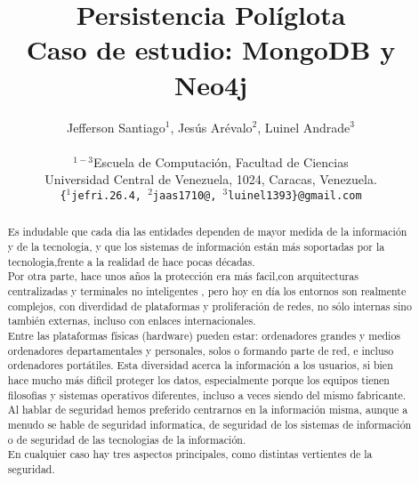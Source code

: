 \documentclass[conference]{IEEEtran}
\begin{document}
\title{Persistencia Pol\'iglota\\Caso de estudio: MongoDB y Neo4j}

\author{
Jefferson Santiago$^{1}$, Jes\'us Ar\'evalo$^{2}$, Luinel Andrade$^{3}$\\ \\
\small{$^{1-3}$Escuela de Computaci\'on, Facultad de Ciencias}\\
\small{Universidad Central de Venezuela, 1024, Caracas, Venezuela.}\\
\small{\texttt{\{$^{1}$jefri.26.4, $^{2}$jaas1710@, $^{3}$luinel1393\}@gmail.com}} %
}
\author{
\and

}


\maketitle


\begin{abstract}
Es indudable que cada dia las entidades dependen de mayor medida de la información y de la tecnologia, y que los sistemas de información están más soportadas por la tecnologia,frente a la realidad de hace pocas décadas.
\\
Por otra parte, hace unos años la protección era más facil,con arquitecturas centralizadas y terminales no inteligentes , pero hoy en día los entornos son realmente complejos, con diverdidad de plataformas y proliferación de redes, no sólo internas sino también externas, incluso con enlaces internacionales.
\\
Entre las plataformas físicas (hardware) pueden estar: ordenadores grandes y medios ordenadores departamentales y personales, solos o formando parte de red, e incluso ordenadores portátiles. Esta diversidad acerca la información a los usuarios, si bien hace mucho más dificil proteger los datos, especialmente porque los equipos tienen filosofias y sistemas operativos diferentes, incluso a veces siendo del mismo fabricante.
\\
Al hablar de seguridad hemos preferido centrarnos en la información misma, aunque a menudo se hable de seguridad informatica, de seguridad de los sistemas de información o de seguridad de las tecnologias de la información.
\\
En cualquier caso hay tres aspectos principales, como distintas vertientes de la seguridad.
\\
\end{abstract}
\end{document}

